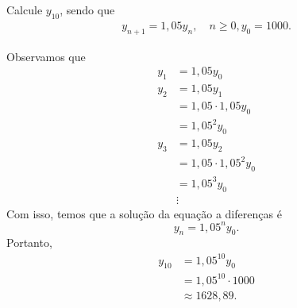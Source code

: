 \begin{exeresol}
  Calcule $y_{10}$, sendo que
  \begin{align}
    y_{n+1} = 1,05y_n,\quad n\geq0,
    y_0 = 1000.
  \end{align}
\end{exeresol}
\begin{resol}
  Observamos que
  \begin{align}
    y_1 &= 1,05y_0\\
    y_2 &= 1,05y_1\\
        &= 1,05\cdot 1,05y_0 \\
        &= 1,05^2y_0\\
    y_3 &= 1,05y_2\\
        &=1,05\cdot 1,05^2y_0\\
        &= 1,05^3y_0\\
        &\vdots
  \end{align}
  Com isso, temos que a solução da equação a diferenças é
  \begin{equation}
    y_n = 1,05^ny_0.
  \end{equation}
  Portanto,
  \begin{align}
    y_{10} &= 1,05^{10}y_0 \\
           &= 1,05^{10}\cdot 1000 \\
           &\approx 1628,89.
  \end{align}
\end{resol}

